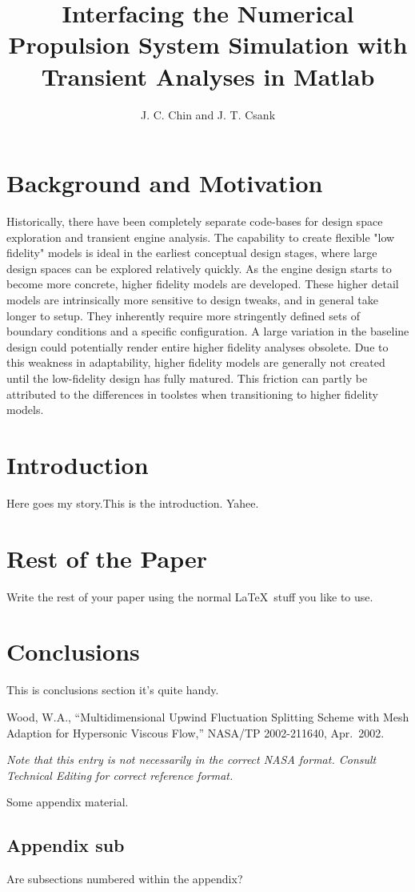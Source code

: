 \documentclass[]             %
{NASA}                       %
\title{Interfacing the Numerical Propulsion System Simulation with Transient Analyses in Matlab}
\author{J. C. Chin and J. T. Csank} %
\begin{document}

\section{Background and Motivation}
Historically, there have been completely separate code-bases for design space exploration and transient engine analysis. The capability to create flexible "low fidelity" models is ideal in the earliest  conceptual design stages, where large design spaces can be explored relatively quickly. As the engine design starts to become more concrete, higher fidelity models are developed. These higher detail models are intrinsically more sensitive to design tweaks, and in general take longer to setup. They inherently require more stringently defined sets of boundary conditions and a specific configuration. A large variation in the baseline design could potentially render entire higher fidelity analyses obsolete. Due to this weakness in adaptability, higher fidelity models are generally not created until the low-fidelity design has fully matured. This friction can partly be attributed to the differences in toolstes when transitioning to higher fidelity models. 

\section{Introduction}
Here goes my story.This is the introduction.
Yahee.

\section{Rest of the Paper}
Write the rest of your paper using the normal \LaTeX\ stuff you like to
use.

\section{Conclusions}
This is conclusions section it's quite handy.

\begin{thebibliography}{WoodTP}
 Wood, W.A., ``Multidimensional Upwind
  Fluctuation Splitting Scheme with Mesh Adaption for Hypersonic Viscous
  Flow,'' NASA/TP 2002-211640, Apr.~2002.
\end{thebibliography}
{\em Note that this entry is not necessarily in the correct NASA
  format. Consult Technical Editing for correct reference format.}

\newpage
\appendix

Some appendix material.

\subsection{Appendix sub}
Are subsections numbered within the appendix?

\end{document}
